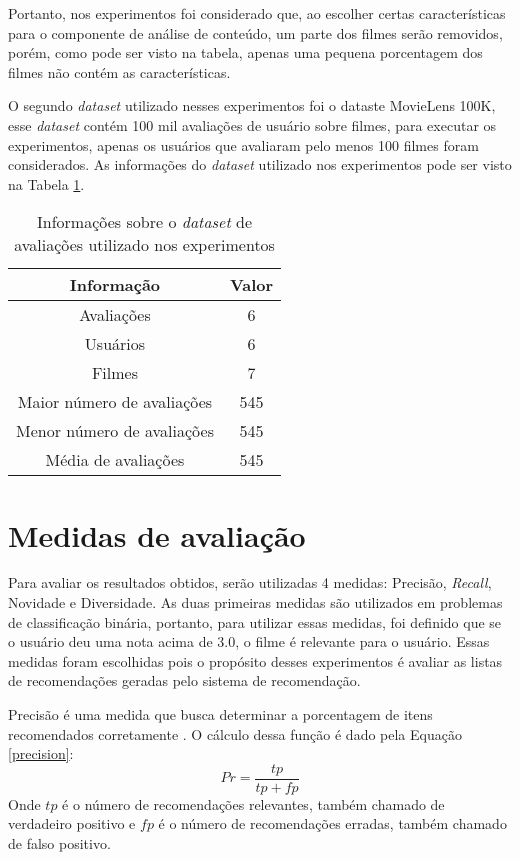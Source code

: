 Portanto, nos experimentos foi considerado que, ao escolher certas características para o componente de análise de conteúdo, um parte dos filmes serão removidos, porém, como pode ser visto na tabela, apenas uma pequena porcentagem dos filmes não contém as características.

O segundo \textit{dataset} utilizado nesses experimentos foi o dataste MovieLens 100K, esse \textit{dataset} contém 100 mil avaliações de usuário sobre filmes, para executar os experimentos, apenas os usuários que avaliaram pelo menos 100 filmes foram considerados. As informações do \textit{dataset} utilizado nos experimentos pode ser visto na Tabela \ref{tab:movielens}.

\begin{table}[h]
\label{tab:movielens}
 \centering
\begin{tabular}{|c| c |}
\hline
Informação &  Valor \\ 
\hline
Avaliações & 6  \\ 
\hline
Usuários & 6 \\ 
\hline
Filmes & 7 \\
\hline
Maior número de avaliações & 545  \\
\hline
Menor número de avaliações & 545 \\
\hline
Média de avaliações & 545  \\
\hline    
\end{tabular}
\caption{\label{tab:movielens}Informações sobre o \textit{dataset} de avaliações utilizado nos experimentos}
\end{table}
\section{Medidas de avaliação}
Para avaliar os resultados obtidos, serão utilizadas 4 medidas: Precisão, \textit{Recall}, Novidade e Diversidade. As duas primeiras medidas são utilizados em problemas de classificação binária, portanto, para utilizar essas medidas, foi definido que se o usuário deu uma nota acima de 3.0, o filme é relevante para o usuário.
Essas medidas foram escolhidas pois o propósito desses experimentos é avaliar as listas de recomendações geradas pelo sistema de recomendação. 

Precisão é uma medida que busca determinar a porcentagem de itens recomendados corretamente \cite{olson2008advanced}. O cálculo dessa função é dado pela Equação \ref{precision}:
\begin{equation}
\label{precision}
    Pr = \frac{tp}{tp + fp} 
\end{equation}
Onde \(tp\) é o número de recomendações relevantes, também chamado de verdadeiro positivo e \(fp\) é o número de recomendações erradas, também chamado de falso positivo.

